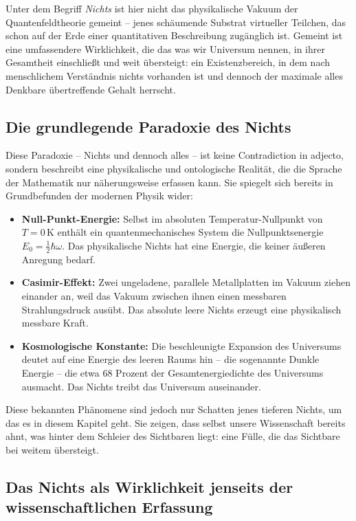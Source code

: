 ﻿\documentclass[12pt,a4paper]{report}
\begin{document}
Unter dem Begriff \emph{Nichts} ist hier nicht das physikalische Vakuum der Quantenfeldtheorie gemeint -- jenes schäumende Substrat virtueller Teilchen, das schon auf der Erde einer quantitativen Beschreibung zugänglich ist. Gemeint ist eine umfassendere Wirklichkeit, die das was wir \glqq Universum\grqq{} nennen, in ihrer Gesamtheit einschließt und weit übersteigt: ein Existenzbereich, in dem nach menschlichem Verständnis \glqq nichts\grqq{} vorhanden ist und dennoch der maximale alles Denkbare übertreffende Gehalt herrscht.

\subsection{Die grundlegende Paradoxie des Nichts}

Diese Paradoxie -- Nichts und dennoch alles -- ist keine Contradiction in adjecto, sondern beschreibt eine physikalische und ontologische Realität, die die Sprache der Mathematik nur näherungsweise erfassen kann. Sie spiegelt sich bereits in Grundbefunden der modernen Physik wider:

\begin{itemize}
	\item \textbf{Null-Punkt-Energie:} Selbst im absoluten Tempe\-ratur-Nullpunkt von $T = 0\,\text{K}$ enthält ein quantenmechanisches System die Nullpunktsenergie $E_0 = \frac{1}{2}\hbar\omega$. Das physikalische \glqq Nichts\grqq{} hat eine Energie, die keiner äußeren Anregung bedarf.
	\item \textbf{Casimir-Effekt:} Zwei ungeladene, parallele Metallplatten im Vakuum ziehen einander an, weil das Vakuum zwischen ihnen einen messbaren Strahlungsdruck ausübt. Das absolute leere Nichts erzeugt eine physikalisch messbare Kraft.
	\item \textbf{Kosmologische Konstante:} Die beschleunigte Expansion des Universums deutet auf eine Energie des leeren Raums hin -- die sogenannte Dunkle Energie -- die etwa 68 Prozent der Gesamtenergiedichte des Universums ausmacht. Das Nichts treibt das Universum auseinander.
\end{itemize}

Diese bekannten Phänomene sind jedoch nur Schatten jenes tieferen Nichts, um das es in diesem Kapitel geht. Sie zeigen, dass selbst unsere Wissenschaft bereits ahnt, was hinter dem Schleier des Sichtbaren liegt: eine Fülle, die das Sichtbare bei weitem übersteigt.

\subsection{Das Nichts als Wirklichkeit jenseits der wissenschaftlichen Erfassung}
\end{document}
